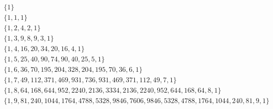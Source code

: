 $
\begin{array}{c}
\{1\} \\
\{1,1,1\} \\
\{1,2,4,2,1\} \\
\{1,3,9,8,9,3,1\} \\
\{1,4,16,20,34,20,16,4,1\} \\
\{1,5,25,40,90,74,90,40,25,5,1\} \\
\{1,6,36,70,195,204,328,204,195,70,36,6,1\} \\
\{1,7,49,112,371,469,931,736,931,469,371,112,49,7,1\} \\
\{1,8,64,168,644,952,2240,2136,3334,2136,2240,952,644,168,64,8,1\} \\
\{1,9,81,240,1044,1764,4788,5328,9846,7606,9846,5328,4788,1764,1044,240,81,9,1\} \\
\end{array}
$
